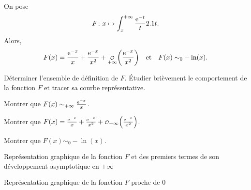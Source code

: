 
\begin{prop}
On pose
\[
\fonctionligne[F]{x}{\int_x^{+\infty} \frac{\e^{-t}}{t} \d t}.
\]
Alors,
\[
F(x) = \frac{\e^{-x}}{x} + \frac{\e^{-x}}{x^2} + \petito_{+\infty}\mathopen{}\bigg(\frac{\e^{-x}}{x^2}\bigg)
\quad \text{et} \quad
F(x) \sim_0 -\ln(x).
\]
\end{prop}

\begin{exercice}
\begin{questions}
\item Déterminer l'ensemble de définition de $F$. Étudier brièvement le comportement de la fonction $F$ et tracer sa courbe représentative.

\item Montrer que $F(x) \sim_{+\infty} \frac{\e^{-x}}{x}$.

\item Montrer que $F(x) = \frac{\e^{-x}}{x} + \frac{\e^{-x}}{x^2} + \petito_{+\infty}\mathopen{}\left(\frac{\e^{-x}}{x^2}\right)$.
       
\item Montrer que $F(x) \sim_0 -\ln(x)$.
\end{questions}
\end{exercice}

\begin{marginfigure}[-8cm]
    \centering
    
    \caption{Représentation graphique de la fonction $F$ et des premiers termes de son développement asymptotique en $+\infty$}
\end{marginfigure}
\begin{marginfigure}[-1cm]
    \centering
    
    \caption{Représentation graphique de la fonction $F$ proche de $0$}
\end{marginfigure}

